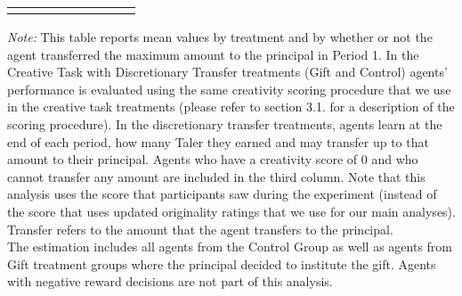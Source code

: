 \begin{table}[h]
\begin{center}
{\begin{tabular}{lcccccccc}
\hline\hline\noalign{\medskip}
\end{tabular}}
\begin{minipage}{\textwidth}
\footnotesize {\it Note:} This table reports mean values by treatment and by whether or not the agent transferred the maximum amount to the principal in Period 1. 
In the Creative Task with Discretionary Transfer treatments (Gift and Control) agents’ performance is evaluated using the same creativity scoring procedure that we use in the creative task treatments (please refer to section 3.1. for a description of the scoring procedure). In the discretionary transfer treatments, agents learn at the end of each period, how many Taler they earned and may transfer up to that amount to their principal. Agents who have a creativity score of 0 and who cannot transfer any amount are included in the third column. 
Note that this analysis uses the score that participants saw during the experiment (instead of the score that uses updated originality ratings that we use for our main analyses). Transfer refers to the amount that the agent transfers to the principal. \\
The estimation includes all agents from the Control Group as well as agents from Gift treatment groups where the principal decided to institute the gift. Agents with negative reward decisions are not part of this analysis. 
\end{minipage}
\end{center}
\end{table}
